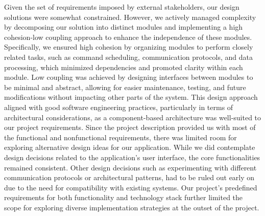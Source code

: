 \documentclass[12pt, titlepage]{article}
\begin{document}
Given the set of requirements imposed by external stakeholders, our design solutions were somewhat constrained. However, we actively managed complexity by decomposing our solution into distinct modules and implementing a high cohesion-low coupling approach to enhance the independence of these modules. Specifically, we ensured high cohesion by organizing modules to perform closely related tasks, such as command scheduling, communication protocols, and data processing, which minimized dependencies and promoted clarity within each module. Low coupling was achieved by designing interfaces between modules to be minimal and abstract, allowing for easier maintenance, testing, and future modifications without impacting other parts of the system. This design approach aligned with good software engineering practices, particularly in terms of architectural considerations, as a component-based architecture was well-suited to our project requirements. Since the project description provided us with most of the functional and nonfunctional requirements, there was limited room for exploring alternative design ideas for our application. While we did contemplate design decisions related to the application's user interface, the core functionalities remained consistent. Other design decisions such as experimenting with different communication protocols or architectural patterns, had to be ruled out early on due to the need for compatibility with existing systems. Our project's predefined requirements for both functionality and technology stack further limited the scope for exploring diverse implementation strategies at the outset of the project.
\end{document}
